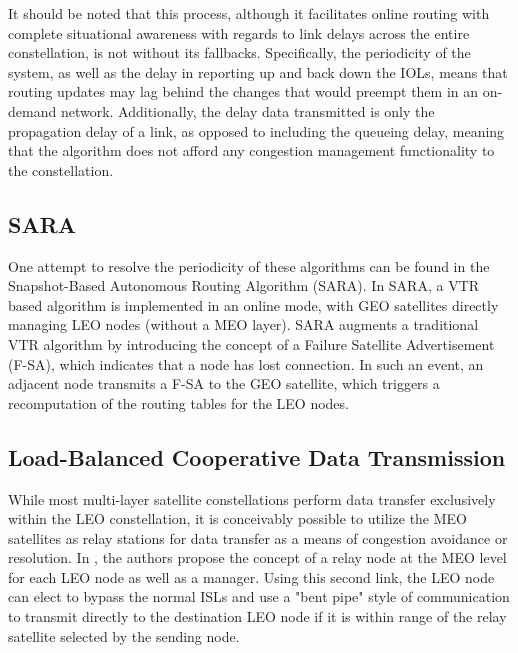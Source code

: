 It should be noted that this process, although it facilitates online routing with complete situational awareness with regards to link delays across the entire constellation, is not without its fallbacks. Specifically, the periodicity of the system, as well as the delay in reporting up and back down the IOLs, means that routing updates may lag behind the changes that would preempt them in an on-demand network. Additionally, the delay data transmitted is only the propagation delay of a link, as opposed to including the queueing delay, meaning that the algorithm does not afford any congestion management functionality to the constellation.

\subsection{SARA}\label{subsec:sara}
One attempt to resolve the periodicity of these algorithms can be found in the Snapshot-Based Autonomous Routing Algorithm (SARA). In SARA, a VTR based algorithm is implemented in an online mode, with GEO satellites directly managing LEO nodes (without a MEO layer). SARA augments a traditional VTR algorithm by introducing the concept of a Failure Satellite Advertisement (F-SA), which indicates that a node has lost connection. In such an event, an adjacent node transmits a F-SA to the GEO satellite, which triggers a recomputation of the routing tables for the LEO nodes.

\subsection{Load-Balanced Cooperative Data Transmission}
While most multi-layer satellite constellations perform data transfer exclusively within the LEO constellation, it is conceivably possible to utilize the MEO satellites as relay stations for data transfer as a means of congestion avoidance or resolution. In \cite{li_load-balanced_2018}, the authors propose the concept of a relay node at the MEO level for each LEO node as well as a manager. Using this second link, the LEO node can elect to bypass the normal ISLs and use a "bent pipe" style of communication to transmit directly to the destination LEO node if it is within range of the relay satellite selected by the sending node.